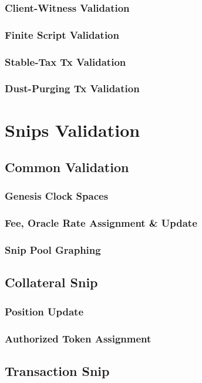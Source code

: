 \documentclass[a4paper,11pt]{article}
\begin{document}
\subsubsection{Client-Witness Validation}
\subsubsection{Finite Script Validation}
\subsubsection{Stable-Tax Tx Validation}
\subsubsection{Dust-Purging Tx Validation}


\section{Snips Validation}
\subsection{Common Validation}
\subsubsection{Genesis Clock Spaces}
\subsubsection{Fee, Oracle Rate Assignment \& Update}
\subsubsection{Snip Pool Graphing}
\subsection{Collateral Snip}
\subsubsection{Position Update}
\subsubsection{Authorized Token Assignment}
\subsection{Transaction Snip}
\end{document}
